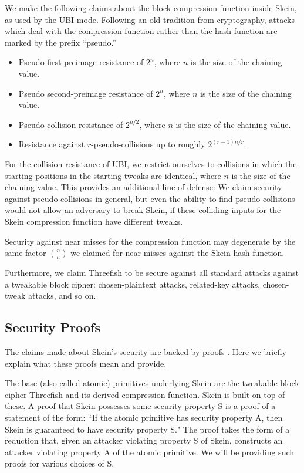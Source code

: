 \documentclass[11pt,twoside]{article}
\begin{document}
We make the following claims about the block compression function inside Skein, as used by the UBI mode. Following an old tradition from cryptography, attacks which deal with the compression function rather than the hash function are marked by the prefix ``pseudo.''

\begin{itemize}
\item Pseudo first-preimage resistance of $2^n$, where $n$ is the size of the chaining value.
\item Pseudo second-preimage resistance of $2^n$, where $n$ is the size of the chaining value.
\item Pseudo-collision resistance of $2^{n/2}$, where $n$ is the size of the chaining value.
\item Resistance against $r$-pseudo-collisions up to roughly $2^{(r-1)n/r}$.
\end{itemize}

For the collision resistance of UBI, we restrict ourselves to collisions in which the starting positions in the starting tweaks are identical, where $n$ is the size of the chaining value.  This provides an additional line of defense: We claim security against pseudo-collisions in general, but even the ability to find pseudo-collisions would not allow an adversary to break Skein, if these colliding inputs for the Skein compression function have different tweaks.

Security against near misses for the compression function may degenerate by the same factor $\binom{n}{h}$ we claimed for near misses against the Skein hash function.

Furthermore, we claim Threefish to be secure against all standard attacks against a tweakable block cipher: chosen-plaintext attacks, related-key attacks, chosen-tweak attacks, and so on.

\subsection{Security Proofs}

The claims made about Skein's security are backed by proofs \cite{BK09}.  Here we briefly explain what these proofs mean and provide.

The base (also called atomic) primitives underlying Skein are the tweakable block cipher Threefish and its derived compression function.  Skein is built on top of these.  A proof that Skein possesses some security property S is a proof of a statement of the form: ``If the atomic primitive has security property A, then Skein is guaranteed to have security property S." The proof takes the form of a reduction that, given an attacker violating property S of Skein, constructs an attacker violating property A of the atomic primitive. We will be providing such proofs for various choices of S.
\end{document}
